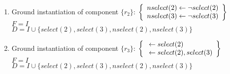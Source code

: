 \begin{Loesung}
\begin{UList}
\begin{description}
{\begin{enumerate}
  $F = I$ 
  \\ 
  $D = I \cup \{ select(2), select(3) \}$
  \item Ground instantiation of component $\{r_2\}$:
  \( \left\{
  \begin{array}{r@{}c@{}l}
    nselect(2) & {} \leftarrow {} & \naf{select(2)} \\
    nselect(3) & {} \leftarrow {} & \naf{select(3)}
  \end{array}
  \right\}
  \)
  \\
  $F = I$ 
  \\ 
  $D = I \cup \{ select(2), select(3), nselect(2), nselect(3) \}$
  \item Ground instantiation of component $\{r_3\}$:
  \( \left\{
  \begin{array}{r@{}c@{}l}
    & {} \leftarrow {} & select(2) \\
    & {} \leftarrow {} & select(2), select(3)
  \end{array}
  \right\}
  \)
  \\
  $F = I$ 
  \\ 
  $D = I \cup \{ select(2), select(3), nselect(2), nselect(3) \}$
\end{enumerate}
}
%
\end{description}
%
\item 
{}
\end{UList}
\end{Loesung}
